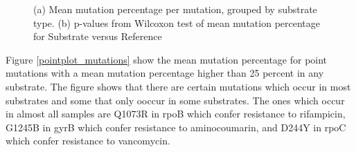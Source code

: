 \begin{figure}[h!]
    \centering
    \caption{(a) Mean mutation percentage per mutation, grouped by substrate type. (b) p-values from Wilcoxon test of mean mutation percentage for Substrate versus Reference}
    \label{both_mean_genes_substrate}
\end{figure}

Figure \ref{pointplot_mutations} show the mean mutation percentage for point mutations with a mean mutation percentage higher than 25 percent in any substrate. 
The figure shows that there are certain mutations which occur in most substrates and some that only ooccur in some substrates. The ones which occur in almost all samples are Q1073R in rpoB which confer resistance to rifampicin, G1245B in gyrB which confer resistance to aminocoumarin, and D244Y in rpoC which confer resistance to vancomycin. 


